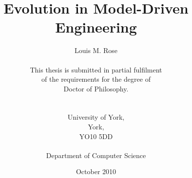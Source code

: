 \title{Evolution in Model-Driven Engineering}
\author{Louis M. Rose \\ \\
This thesis is submitted in partial fulfilment \\
of the requirements for the degree of \\
Doctor of Philosophy. \\
\\ \\
University of York, \\
York, \\ 
YO10 5DD \\
\\
Department of Computer Science \\ }
\date{October 2010}